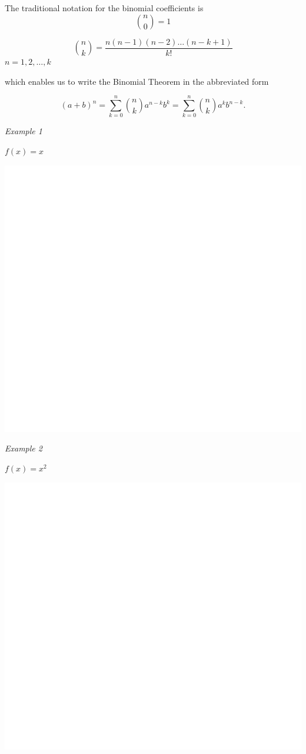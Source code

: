 \documentclass[]{book}
\begin{document}
The traditional notation for the binomial coefficients is
\[{n \choose 0}=1\]

\[{n \choose k}=\frac{n(n-1)(n-2)\dots (n-k+1)}{k!}\] \(n=1,2,\dots, k\)

which enables us to write the Binomial Theorem in the abbreviated form

\[(a+b)^n = \sum_{k=0}^n {n \choose k }a^{n-k}b^k = \sum_{k=0}^n {n \choose k }a^{k}b^{n-k}.\]

\emph{Example 1}

\(f(x)=x\)

\begin{center}\includegraphics[width=1\linewidth]{figure/LB3-1} \end{center}

\newpage

\emph{Example 2}

\(f(x)=x^2\)

\begin{center}\includegraphics[width=1\linewidth]{figure/LB4-1} \end{center}
\end{document}
